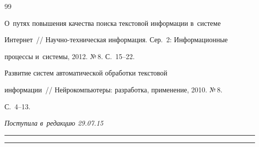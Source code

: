 {{\begin{thebibliography}{99}


О~путях повышения качества поиска текстовой информации в~системе 


Интернет~/\!\!/ Научно-техническая информация. Сер.~2: Информационные 


процессы и~системы, 2012. №\,8. С.~15--22. 







 Развитие систем автоматической обработки текстовой 


информации~/\!\!/ Нейрокомпьютеры: разработка, применение, 2010. №\,8.  


С.~4--13.





     \end{thebibliography}


} }








\vspace*{-2pt}





\hfill{\small\textit{Поступила в~редакцию 29.07.15}}














\vspace*{8pt}





\hrule





\vspace*{2pt}





\hrule





\vspace*{8pt}









